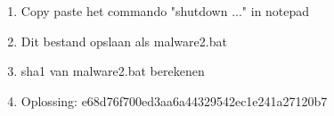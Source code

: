 \begin{enumerate}
  \item Copy paste het commando "shutdown ..." in notepad
  \item Dit bestand opslaan als malware2.bat
  \item sha1 van malware2.bat berekenen
  \item Oplossing: e68d76f700ed3aa6a44329542ec1e241a27120b7
\end{enumerate}